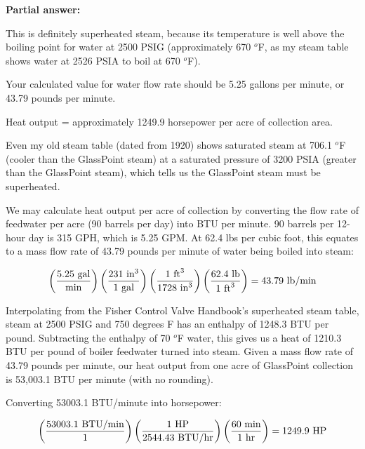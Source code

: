 \noindent
{\bf Partial answer:}

\vskip 10pt

This is definitely superheated steam, because its temperature is well above the boiling point for water at 2500 PSIG (approximately 670 $^{o}$F, as my steam table shows water at 2526 PSIA to boil at 670 $^{o}$F).

\vskip 10pt

Your calculated value for water flow rate should be 5.25 gallons per minute, or 43.79 pounds per minute.

\vskip 10pt

Heat output = approximately 1249.9 horsepower per acre of collection area.







Even my old steam table (dated from 1920) shows saturated steam at 706.1 $^{o}$F (cooler than the GlassPoint steam) at a saturated pressure of 3200 PSIA (greater than the GlassPoint steam), which tells us the GlassPoint steam must be superheated.

\vskip 10pt

We may calculate heat output per acre of collection by converting the flow rate of feedwater per acre (90 barrels per day) into BTU per minute.  90 barrels per 12-hour day is 315 GPH, which is 5.25 GPM.  At 62.4 lbs per cubic foot, this equates to a mass flow rate of 43.79 pounds per minute of water being boiled into steam:

$$\left( {5.25 \hbox{ gal} \over \hbox{min}} \right) \left( {231 \hbox{ in}^3 \over 1 \hbox{ gal}} \right) \left( {1 \hbox{ ft}^3 \over 1728 \hbox{ in}^3} \right) \left( {62.4 \hbox{ lb} \over 1 \hbox{ ft}^3} \right) = 43.79 \hbox{ lb/min}$$

Interpolating from the Fisher Control Valve Handbook's superheated steam table, steam at 2500 PSIG and 750 degrees F has an enthalpy of 1248.3 BTU per pound.  Subtracting the enthalpy of 70 $^{o}$F water, this gives us a heat of 1210.3 BTU per pound of boiler feedwater turned into steam.  Given a mass flow rate of 43.79 pounds per minute, our heat output from one acre of GlassPoint collection is 53,003.1 BTU per minute (with no rounding).

Converting 53003.1 BTU/minute into horsepower:

$$\left( {53003.1 \hbox{ BTU/min} \over 1} \right) \left( {1 \hbox{ HP} \over 2544.43 \hbox{ BTU/hr}} \right) \left( {60 \hbox{ min} \over 1 \hbox{ hr}} \right) = 1249.9 \hbox{ HP}$$

